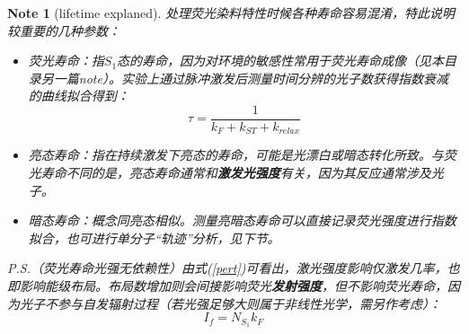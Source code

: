 \documentclass[12pt]{ctexart}%
\newtheorem{note}{Note}
\begin{document}
\begin{note}[lifetime explaned]
    处理荧光染料特性时候各种寿命容易混淆，特此说明较重要的几种参数：
    \begin{itemize}
        \item 荧光寿命：指$S_1$态的寿命，因为对环境的敏感性常用于荧光寿命成像（见本目录另一篇note）。实验上通过脉冲激发后测量时间分辨的光子数获得指数衰减的曲线拟合得到：\[\tau=\frac{1}{k_{F}+k_{ST}+k_{relax}}\]
        \item 亮态寿命：指在持续激发下亮态的寿命，可能是光漂白或暗态转化所致。与荧光寿命不同的是，亮态寿命通常和\textbf{激发光强度}有关，因为其反应通常涉及光子。
        \item 暗态寿命：概念同亮态相似。测量亮暗态寿命可以直接记录荧光强度进行指数拟合，也可进行单分子“轨迹”分析，见下节。
    \end{itemize}
    P.S.（荧光寿命光强无依赖性）由式(\ref{pert})可看出，激光强度影响仅激发几率，也即影响能级布局。布局数增加则会间接影响荧光\textbf{发射强度}，但不影响荧光寿命，因为光子不参与自发辐射过程（若光强足够大则属于非线性光学，需另作考虑）：
    \[I_{f}=N_{S_1}k_{F}\]
\end{note}
\end{document}
